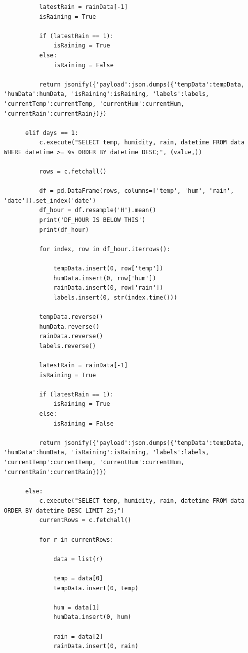 \documentclass[10pt,a4paper]{article}
\begin{document}
\begin{verbatim}
          latestRain = rainData[-1]
          isRaining = True

          if (latestRain == 1):
              isRaining = True
          else:
              isRaining = False

          return jsonify({'payload':json.dumps({'tempData':tempData, 'humData':humData, 'isRaining':isRaining, 'labels':labels, 'currentTemp':currentTemp, 'currentHum':currentHum, 'currentRain':currentRain})})

      elif days == 1:
          c.execute("SELECT temp, humidity, rain, datetime FROM data WHERE datetime >= %s ORDER BY datetime DESC;", (value,))

          rows = c.fetchall()

          df = pd.DataFrame(rows, columns=['temp', 'hum', 'rain', 'date']).set_index('date')
          df_hour = df.resample('H').mean()
          print('DF_HOUR IS BELOW THIS')
          print(df_hour)

          for index, row in df_hour.iterrows():

              tempData.insert(0, row['temp'])
              humData.insert(0, row['hum'])
              rainData.insert(0, row['rain'])
              labels.insert(0, str(index.time()))

          tempData.reverse()
          humData.reverse()
          rainData.reverse()
          labels.reverse()

          latestRain = rainData[-1]
          isRaining = True

          if (latestRain == 1):
              isRaining = True
          else:
              isRaining = False

          return jsonify({'payload':json.dumps({'tempData':tempData, 'humData':humData, 'isRaining':isRaining, 'labels':labels, 'currentTemp':currentTemp, 'currentHum':currentHum, 'currentRain':currentRain})})

      else:
          c.execute("SELECT temp, humidity, rain, datetime FROM data ORDER BY datetime DESC LIMIT 25;")
          currentRows = c.fetchall()

          for r in currentRows:

              data = list(r)

              temp = data[0]
              tempData.insert(0, temp)

              hum = data[1]
              humData.insert(0, hum)

              rain = data[2]
              rainData.insert(0, rain)


\end{verbatim}
\end{document}
